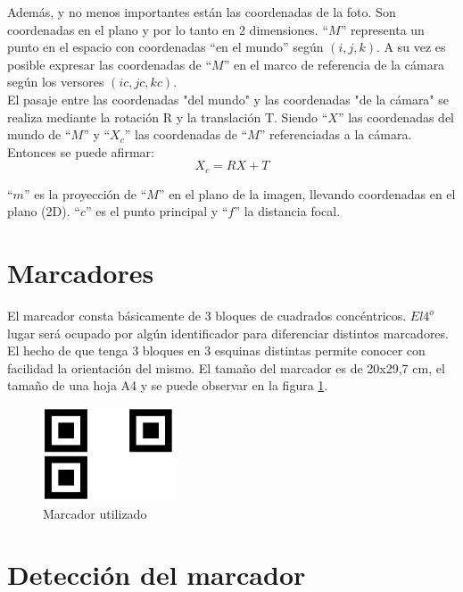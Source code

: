 \documentclass[main]{subfiles}
\begin{document}
Además, y no menos importantes están las coordenadas de la foto. Son coordenadas en el plano y por lo tanto en 2 dimensiones. ``$M$'' representa un punto en el espacio con coordenadas ``en el mundo'' según $(i,j,k)$. A su vez es posible expresar las coordenadas de ``$M$'' en el marco de referencia de la cámara según los versores $(ic,jc,kc)$.\\

El pasaje entre las coordenadas "del mundo" y las coordenadas "de la cámara" se realiza mediante la rotación R y la translación T.
Siendo ``$X$'' las coordenadas del mundo de ``$M$'' y ``$X_c$'' las coordenadas de ``$M$'' referenciadas a la cámara. Entonces se puede afirmar:
$$X_c = R X + T$$

``$m$'' es la proyección de ``$M$'' en el plano de la imagen, llevando coordenadas en el plano (2D). ``$c$'' es el punto principal y ``$f$'' la distancia focal.

\section{Marcadores}

El marcador consta básicamente de 3 bloques de cuadrados concéntricos. $El 4^o$ lugar será ocupado por algún identificador para diferenciar distintos marcadores. El hecho de que tenga 3 bloques en 3 esquinas distintas permite conocer con facilidad la orientación del mismo. El tamaño del marcador es de 20x29,7 cm, el tamaño de una hoja A4 y se puede observar en la figura \ref{fig:marcador}.

\begin{figure}
	\begin{center}
		\includegraphics[width=0.35\textwidth]{./pics_camara/marcador.jpg}
	\end{center}
	\caption{Marcador utilizado}
	\label{fig:marcador}
\end{figure}

\section{Detección del marcador}
\end{document}

